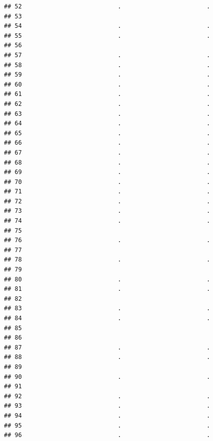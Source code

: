 \documentclass[
]{article}
\begin{document}
\begin{verbatim}
## 52                           .                        .
## 53                                                     
## 54                           .                        .
## 55                           .                        .
## 56                                                     
## 57                           .                        .
## 58                           .                        .
## 59                           .                        .
## 60                           .                        .
## 61                           .                        .
## 62                           .                        .
## 63                           .                        .
## 64                           .                        .
## 65                           .                        .
## 66                           .                        .
## 67                           .                        .
## 68                           .                        .
## 69                           .                        .
## 70                           .                        .
## 71                           .                        .
## 72                           .                        .
## 73                           .                        .
## 74                           .                        .
## 75                                                     
## 76                           .                        .
## 77                                                     
## 78                           .                        .
## 79                                                     
## 80                           .                        .
## 81                           .                        .
## 82                                                     
## 83                           .                        .
## 84                           .                        .
## 85                                                     
## 86                                                     
## 87                           .                        .
## 88                           .                        .
## 89                                                     
## 90                           .                        .
## 91                                                     
## 92                           .                        .
## 93                           .                        .
## 94                           .                        .
## 95                           .                        .
## 96                           .                        .

\end{verbatim}
\end{document}
